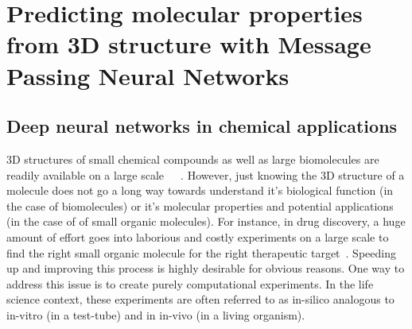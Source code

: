 \section{Predicting molecular properties from 3D structure with Message Passing Neural Networks}
\label{3d-molecules-for-gcnns}

\subsection{Deep neural networks in chemical applications}

3D structures of small chemical compounds as well as large biomolecules are readily available on a large scale~\cite{Ruddigkeit2012}~\cite{Chen2019}~\cite{Ramakrishnan2014}.
However, just knowing the 3D structure of a molecule does not go a long way towards understand it's biological function (in the case of biomolecules) or it's molecular properties and potential applications (in the case of of small organic molecules). For instance, in drug discovery, a huge amount of effort goes into laborious and costly experiments on a large scale to find the right small organic molecule for the right therapeutic target~\cite{Fda-drug-discovery}. Speeding up and improving this process is highly desirable for obvious reasons. 
One way to address this issue is to create purely computational experiments. In the life science context, these experiments are often referred to as in-silico analogous to in-vitro (in a test-tube) and in in-vivo (in a living organism).




